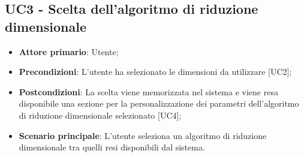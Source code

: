 \subsection{UC3 - Scelta dell'algoritmo di riduzione dimensionale}
\begin{itemize}
	\item \textbf{Attore primario}: Utente;
	\item \textbf{Precondizioni}: L'utente ha selezionato le dimensioni da utilizzare [UC2];
	\item \textbf{Postcondizioni}: La scelta viene memorizzata nel sistema e viene resa disponibile una sezione per la personalizzazione dei parametri dell'algoritmo di riduzione dimensionale selezionato [UC4];
	\item \textbf{Scenario principale}: L'utente seleziona un algoritmo di riduzione dimensionale tra quelli resi disponibili dal sistema.
\end{itemize}